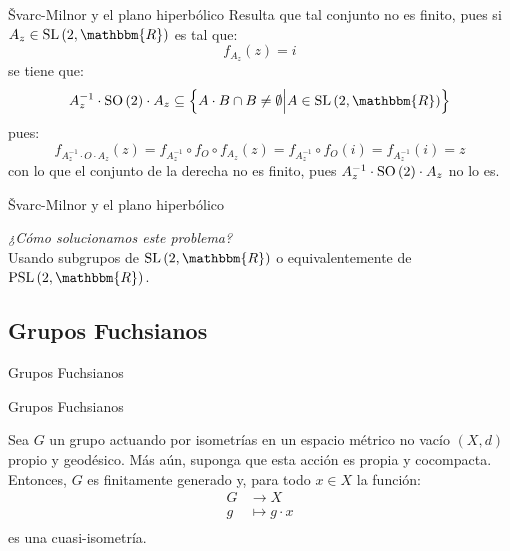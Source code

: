 \documentclass[xcolor=dvipsnames]{beamer}
\theoremstyle{largebreak}
\newcommand{\bbm}[1]{\ensuremath{\mathbbm{#1}}}
\newcommand{\SO}[1]{\ensuremath{\textup{SO}\left(#1\right)}}
\newcommand{\SL}[1]{\ensuremath{\textup{SL}\left(#1\right)}}
\newcommand{\PSL}[1]{\ensuremath{\textup{PSL}\left(#1\right)}}
\begin{document}
\begin{frame}{Švarc-Milnor y el plano hiperbólico}
    Resulta que tal conjunto no es finito, pues si $A_z\in\SL{2,\bbm{R}}$ es tal que:
    \begin{equation*}
        f_{A_z}(z)=i
    \end{equation*}
    se tiene que:
    \begin{equation*}
        A_z^{-1}\cdot\SO{2}\cdot A_z\subseteq\left\{A\cdot B\cap B\neq\emptyset \Big|A\in\SL{2,\bbm{R}} \right\}
    \end{equation*}
    pues:
    \begin{equation*}
        f_{A_z^{-1}\cdot O\cdot A_z}(z)=f_{A_z^{-1}}\circ f_{O}\circ f_{A_z}(z)=f_{A_z^{-1}}\circ f_{O}(i)=f_{A_z^{-1}}(i)=z
    \end{equation*}
    con lo que el conjunto de la derecha no es finito, pues $A_z^{-1}\cdot\SO{2}\cdot A_z$ no lo es.
\end{frame}

\begin{frame}{Švarc-Milnor y el plano hiperbólico}
    \begin{center}
        \Large \textit{¿Cómo solucionamos este problema?}\\
        \pause
        \Large Usando subgrupos de $\SL{2,\bbm{R}}$ o equivalentemente de $\PSL{2,\bbm{R}}$.
    \end{center}
\end{frame}


\subsection{Grupos Fuchsianos}

\begin{frame}
    \begin{center}
        \Large Grupos Fuchsianos
    \end{center}
\end{frame}

\begin{frame}{Grupos Fuchsianos}
    \begin{cor}
        Sea $G$ un grupo actuando por isometrías en un espacio métrico no vacío $(X,d)$ propio y geodésico. Más aún, suponga que esta acción es propia y cocompacta. Entonces, $G$ es finitamente generado y, para todo $x\in X$ la función:
        \begin{equation*}
            \begin{split}
                G&\rightarrow X\\
                g&\mapsto g\cdot x\\
            \end{split}
        \end{equation*}
        es una cuasi-isometría.
    \end{cor}
\end{frame}
\end{document}
